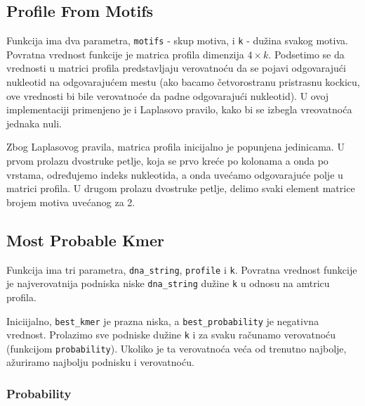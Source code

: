 


\subsection{Profile From Motifs}
\label{profileFromMotifs}

Funkcija ima dva parametra, \texttt{motifs} - skup motiva, i \texttt{k} - dužina svakog motiva. Povratna vrednost funkcije je matrica profila dimenzija $4 \times k$. Podsetimo se da vrednosti u matrici profila predstavljaju verovatnoću da se pojavi odgovarajući nukleotid na odgovarajućem mestu (ako bacamo četvorostranu pristrasnu kockicu, ove vrednosti bi bile verovatnoće da padne odgovarajući nukleotid). U ovoj implementaciji primenjeno je i Laplasovo pravilo, kako bi se izbegla vreovatnoća jednaka nuli.


Zbog Laplasovog pravila, matrica profila inicijalno je popunjena jedinicama. U prvom prolazu dvostruke petlje, koja se prvo kreće po kolonama a onda po vrstama, određujemo indeks nukleotida, a onda uvećamo odgovarajuće polje u matrici profila. U drugom prolazu dvostruke petlje, delimo svaki element matrice brojem motiva uvećanog za 2.





\subsection{Most Probable Kmer}
\label{mostProbableKmer}

Funkcija ima tri parametra, \texttt{dna\_string}, \texttt{profile} i \texttt{k}. Povratna vrednost funkcije je najverovatnija podniska niske \texttt{dna\_string} dužine \texttt{k} u odnosu na amtricu profila.

Iniciijalno, \texttt{best\_kmer} je prazna niska, a \texttt{best\_probability} je negativna vrednost. Prolazimo sve podniske dužine \texttt{k} i za svaku računamo verovatnoću (funkcijom \texttt{probability}). Ukoliko je ta verovatnoća veća od trenutno najbolje, ažuriramo najbolju podnisku i verovatnoću.




\subsubsection{Probability}
\label{probability}

